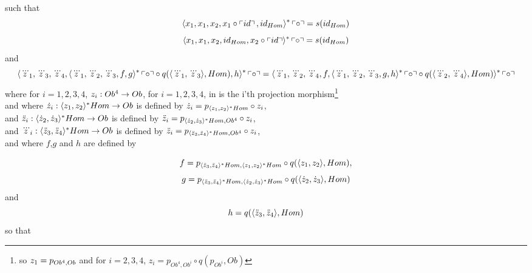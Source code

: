 \begin{lemma}
\begin{itemize}
\end{itemize}
such that
\begin{equation}
\label{leftidentityaxiom}
\leftidentitymapped
\end{equation}
\begin{equation}
\label{rightidentityaxiom}
\rightidentitymapped
\end{equation}
and
\begin{equation}
\label{associativityaxiom}
\assoclhsremapped = \assocrhsremapped
\end{equation}
where for $i = 1, 2,3,4$, $z_i: Ob^4 \rightarrow Ob$, for $i=1,2,3,4$,  in \catcw is the i'th projection morphism\footnote{so $z_1 = p_{Ob^4,Ob}$ 
and  for $i = 2,3, 4$,   $z_i = p_{Ob^4,Ob^i}\circ q(p_{Ob^i},Ob)$} \\
and where   $\dot z_i : \langle z_1,z_2\rangle^*Hom \rightarrow Ob$
                                     is defined by $\dot z_i = p_{\langle z_1,z_2\rangle^*Hom}\circ z_i$,\\ 
and  $\ddot z_i : \langle\dot z_2,\dot z_3\rangle^*Hom \rightarrow Ob$ 
                                     is defined by $\ddot z_i = p_{\langle\dot z_2,\dot z_3\rangle^*Hom, Ob^4}\circ z_i$, \\ 
and $\dddot z_i : \langle\ddot z_3,\ddot z_4\rangle^*Hom \rightarrow Ob$ 
                                     is defined by $\ddot z_i = p_{\langle\ddot z_3,\ddot z_4\rangle^*Hom, Ob^4}\circ z_i$, \\												

and where $f$,$g$ and $h$ are defined by

\begin{equation}
f = p_{\langle\ddot z_3,\ddot z_4\rangle^*Hom,\langle z_1,z_2\rangle^*Hom}\circ q(\langle z_1,z_2\rangle,Hom),
\end{equation}
\begin{equation}
g = p_{\langle\ddot z_3,\ddot z_4\rangle^*Hom,\langle\dot z_2,\dot z_3\rangle^*Hom}\circ q(\langle\dot z_2, \dot z_3\rangle,Hom)
\end{equation}
and
\begin{equation}
h = q(\langle\ddot z_3, \ddot z_4\rangle,Hom)
\end{equation}
so that


\end{lemma}
